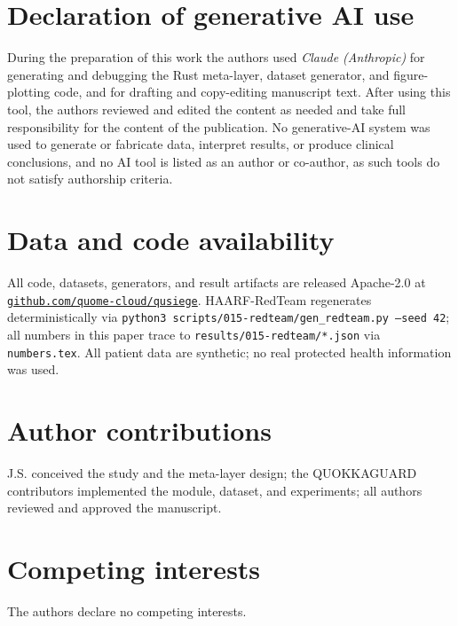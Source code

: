 \documentclass[11pt]{article}
\begin{document}
\section*{Declaration of generative AI use}
During the preparation of this work the authors used \emph{Claude (Anthropic)} for
generating and debugging the Rust meta-layer, dataset generator, and figure-plotting
code, and for drafting and copy-editing manuscript text. After using this tool, the
authors reviewed and edited the content as needed and take full responsibility for
the content of the publication. No generative-AI system was used to generate or
fabricate data, interpret results, or produce clinical conclusions, and no AI tool is
listed as an author or co-author, as such tools do not satisfy authorship criteria.

\section*{Data and code availability}
All code, datasets, generators, and result artifacts are released Apache-2.0 at
\href{https://github.com/quome-cloud/qusiege}{\nolinkurl{github.com/quome-cloud/qusiege}}.
HAARF-RedTeam regenerates deterministically via
\texttt{python3 scripts/015-redteam/gen\_redteam.py --seed 42}; all numbers in this
paper trace to \texttt{results/015-redteam/*.json} via \texttt{numbers.tex}. All
patient data are synthetic; no real protected health information was used.

\section*{Author contributions}
J.S. conceived the study and the meta-layer design; the QUOKKAGUARD contributors
implemented the module, dataset, and experiments; all authors reviewed and approved
the manuscript.

\section*{Competing interests}
The authors declare no competing interests.
\end{document}
